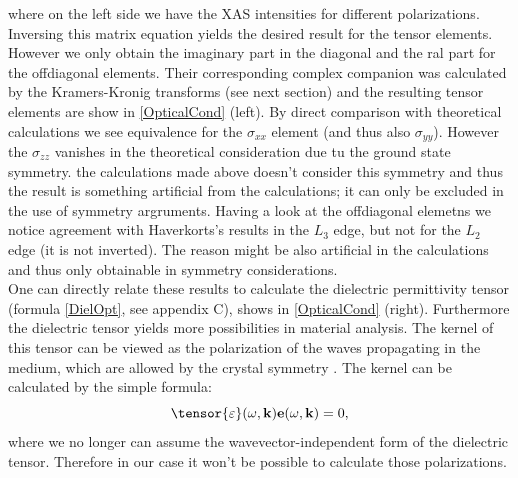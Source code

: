 \documentclass[twocolumn,amsmath,superscriptaddress,amssymb]{revtex4-1}
\let\vec\mathbf
\begin{document}
\noindent where on the left side we have the XAS intensities for different polarizations. Inversing this matrix equation yields the desired result for the tensor elements. However we only obtain the imaginary part in the diagonal and the ral part for the offdiagonal elements. Their corresponding complex companion was calculated by the Kramers-Kronig transforms (see next section) and the resulting tensor elements are show in \ref{OpticalCond} (left). By direct comparison with theoretical calculations \cite{Haverkort} we see equivalence for the $\sigma_{xx}$ element (and thus also $\sigma_{yy}$). However the $\sigma_{zz}$ vanishes in the theoretical consideration due tu the ground state symmetry. the calculations made above doesn't consider this symmetry and thus the result is something artificial from the calculations; it can only be excluded in the use of symmetry argruments. Having a look at the offdiagonal elemetns we notice agreement with Haverkorts's results \cite{Haverkort} in the $L_3$ edge, but not for the $L_2$ edge (it is not inverted). The reason might be also artificial in the calculations and thus only obtainable in symmetry considerations.\\
\indent One can directly relate these results to calculate the dielectric permittivity tensor (formula \ref{DielOpt}, see appendix C), shows in \ref{OpticalCond} (right). Furthermore the dielectric tensor yields more possibilities in material analysis. The kernel of this tensor can be viewed as the polarization of the waves propagating in the medium, which are allowed by the crystal symmetry \cite{Starke}. The kernel can be calculated by the simple formula:
\begin{equation}
\tensor{\varepsilon}(\omega,\vec{k})\vec{e}(\omega,\vec{k})=0,
\end{equation}
\noindent where we no longer can assume the wavevector-independent form of the dielectric tensor. Therefore in our case it won't be possible to calculate those polarizations.
%
\end{document}
